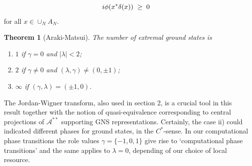 \documentclass[12pt, a4-paper]{amsart}
\numberwithin{equation}{section}
\newcommand{\gl}{\pl \ge \pl}
\newcommand{\pl}{\hspace{.1cm}}
\newcommand{\la}{\lambda}
\newtheorem{theorem}[lemma]{Theorem}
\begin{document}
 \[ i\phi(x^*\delta(x))\gl 0 \]
for all $x\in \cup_N A_N$. 
\begin{theorem}[Araki-Matsui] The number of extremal ground states is
 \begin{enumerate}
     \item[i)] $1$ if $\gamma=0$ and $|\la|<2$;
     \item[ii)] $2$ if $\gamma\neq 0$ and $(\la,\gamma)\neq (0,\pm 1)$;
     \item[iii)] $\infty$ if $(\gamma,\lambda)=(\pm 1,0)$.
 \end{enumerate}
\end{theorem}
The Jordan-Wigner transform, also used in section 2, is a crucial tool in this result together with the notion of quasi-equivalence corresponding to central projections of $\mathcal{A}^{**}$ supporting GNS representations. Certainly, the case ii) could indicated different phases for ground states, in the $C^*$-sense. In our computational phase transitions the role values $\gamma=\{-1,0,1\}$ give rise to `computational phase transitions'
and the same applies to $\la =0$, depending of our choice of local resource.  
\end{document}
